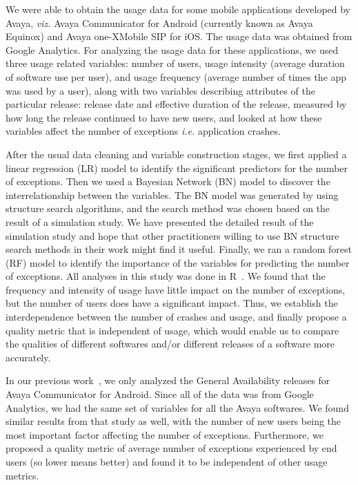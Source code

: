 \documentclass[smallextended]{svjour3}       %
\begin{document}
We were able to obtain the usage data for some mobile applications developed by Avaya, \textit{viz.}  Avaya Communicator for Android (currently known as Avaya Equinox\textregistered) and Avaya one-X\textregistered  Mobile SIP for iOS. The usage data was obtained from Google Analytics. 
For analyzing the usage data for these applications, we used three usage related variables: number of users, 
usage intensity (average duration of software use per user), and usage frequency 
(average number of times the app was used by a user), along with two variables describing attributes 
of the particular release: release date and effective duration of the release, measured by how 
long the release continued to have new users, and looked at how these variables affect 
the number of exceptions \textit{i.e.} application crashes.  

After the usual data cleaning and variable construction stages, we first applied a linear regression (LR) model to identify the significant predictors for the number of exceptions. Then we used a Bayesian Network (BN) model to discover the interrelationship between the variables. The BN model was generated by using structure search algorithms, and the search method was chosen based on the result of a simulation study. We have presented the detailed result of the simulation study and hope that other practitioners willing to use BN structure search methods in their work might find it useful.  Finally, we ran a random forest (RF) model to identify the importance of the variables for predicting the number of exceptions. All analyses in this study was done in R~\cite{R}. We found that the frequency and intensity of usage have little impact on the number of exceptions, but the number of users does have a significant impact. Thus, we establish the interdependence between the number of crashes and usage, and finally propose a quality metric that is independent of usage, which would enable us to compare the qualities of different softwares and/or different releases of a software more accurately. 

In our previous work~\cite{dey2018modeling}, we only analyzed the
General Availability releases for  Avaya Communicator for
Android. Since all of the data was from Google Analytics, we had
the same set of variables for all the Avaya softwares. We found
similar results from that study as well, with the number of new
users being the most important factor affecting the number of
exceptions. 
Furthermore, we proposed a quality metric of average number of
exceptions experienced by end users (so lower means better) and
found it to be independent of other usage metrics.  
\end{document}
